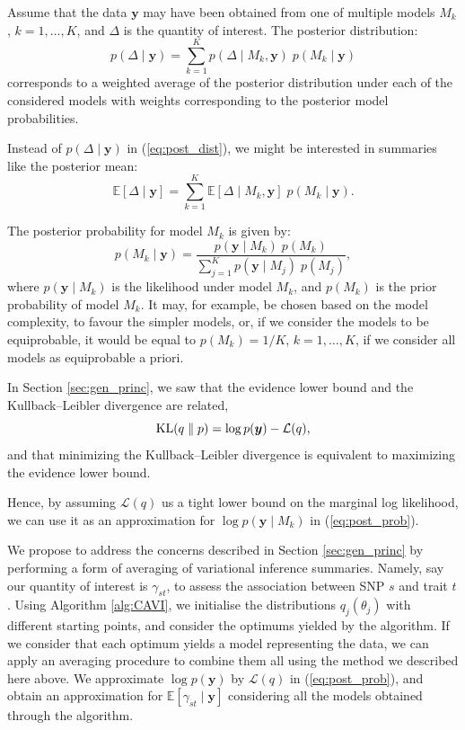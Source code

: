 \documentclass[a4paper, 11pt]{report}
\numberwithin{equation}{chapter}
\DeclareMathOperator*{\KL}{{\rm KL}}
\begin{document}
Assume that the data $\boldsymbol{y}$ may have been obtained from one of multiple models $M_k$, $k= 1,\ldots,K$, and $\Delta$ is the quantity of interest. The posterior distribution:
\begin{equation}
p(\Delta \mid \boldsymbol{y}) = \sum_{k=1}^K p(\Delta \mid M_k,\boldsymbol{y}) \; p(M_k \mid \boldsymbol{y})
\label{eq:post_dist}
\end{equation}
corresponds to a weighted average of the posterior distribution under each of the considered models with weights corresponding to the posterior model probabilities.

Instead of $p(\Delta \mid \boldsymbol{y})$ in (\ref{eq:post_dist}), we might be interested in summaries like the posterior mean:
\begin{equation*}
\mathbb{E}\left[\Delta \mid \boldsymbol{y}\right] = \sum_{k=1}^K\mathbb{E}\left[\Delta \mid M_k, \boldsymbol{y}\right]\;p(M_k \mid \boldsymbol{y}).
\end{equation*}

The posterior probability for model $M_k$ is given by:
\begin{equation}
p(M_k \mid \boldsymbol{y}) = \frac{p(\boldsymbol{y} \mid M_k)\; p(M_k)}{\sum_{j=1}^K p(\boldsymbol{y} \mid M_j)\; p(M_j)},
\label{eq:post_prob}
\end{equation}
where $p(\boldsymbol{y} \mid M_k)$ is the likelihood under model $M_k$, and $p(M_k)$ is the prior probability of model $M_k$. It may, for example, be chosen based on the model complexity, to favour the simpler models, or, if we consider the models to be equiprobable, it would be equal to $p(M_k) = 1/K$, $k = 1,\ldots,K$, if we consider all models as equiprobable a priori.  

In Section \ref{sec:gen_princ}, we saw that the evidence lower bound and the Kullback--Leibler divergence are related, 
\begin{equation*}
\KL(q\parallel p) = \log p (\boldsymbol{y}) - \mathcal{L}(q),
\end{equation*}
and that minimizing the Kullback--Leibler divergence is equivalent to maximizing the evidence lower bound.

Hence, by assuming $\mathcal{L}(q)$ us a tight lower bound on the marginal log likelihood, we can use it as an approximation for $\log p(\boldsymbol{y}\mid M_k)$ in (\ref{eq:post_prob}).

We propose to address the concerns described in Section \ref{sec:gen_princ} by performing a form of averaging of variational inference summaries. Namely, say our quantity of interest is $\gamma_{st}$, to assess the association between SNP $s$ and trait $t$. Using Algorithm \ref{alg:CAVI}, we initialise the distributions $q_j(\theta_j)$ with different starting points, and consider the optimums yielded by the algorithm. If we consider that each optimum yields a model representing the data, we can apply an averaging procedure to combine them all using the method we described here above. We approximate $\log p(\boldsymbol{y})$ by $\mathcal{L}(q)$ in (\ref{eq:post_prob}), and obtain an approximation for $\mathbb{E}\left[\gamma_{st}\mid \boldsymbol{y}\right]$ considering all the models obtained through the algorithm.
\end{document}

